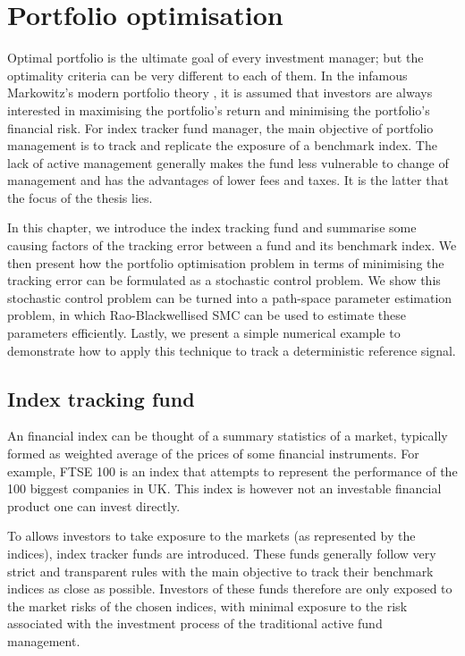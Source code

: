 \chapter{Portfolio optimisation}
\graphicspath{{Chapter4/figures/}}
\label{cha:po}
Optimal portfolio is the ultimate goal of every investment manager; but the optimality criteria can be very different to each of them. In the infamous Markowitz's modern portfolio theory \cite{HM52}, it is assumed that investors are always interested in maximising the portfolio's return and minimising the portfolio's financial risk. For index tracker fund manager, the main objective of portfolio management is to track and replicate the exposure of a benchmark index. The lack of active management generally makes the fund less vulnerable to change of management and has the advantages of lower fees and taxes. It is the latter that the focus of the thesis lies.
 
In this chapter, we introduce the index tracking fund and summarise some causing factors of the tracking error between a fund and its benchmark index. We then present how the portfolio optimisation problem in terms of minimising the tracking error can be formulated as a stochastic control problem. We show this stochastic control problem can be turned into a path-space parameter estimation problem, in which Rao-Blackwellised SMC can be used to estimate these parameters efficiently. Lastly, we present a simple numerical example to demonstrate how to apply this technique to track a deterministic reference signal.
 
\section{Index tracking fund}
An financial index can be thought of a summary statistics of a market, typically formed as weighted average of the prices of some financial instruments. For example, FTSE 100 is an index that attempts to represent the performance of the 100 biggest companies in UK. This index is however not an investable financial product one can invest directly.
 
To allows investors to take exposure to the markets (as represented by the indices), index tracker funds are introduced. These funds generally follow very strict and transparent rules with the main objective to track their benchmark indices as close as possible. Investors of these funds therefore are only exposed to the market risks of the chosen indices, with minimal exposure to the risk associated with the investment process of the traditional active fund management.
 
